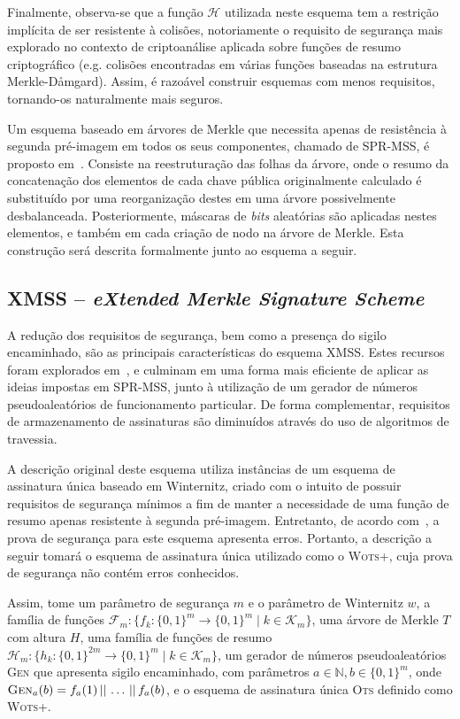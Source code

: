 \documentclass[12pt]{report}
\newcommand{\hh}{\mathcal{H}}
\newcommand{\concat}{\, \vert \vert \,}
\newcommand{\binwds}[1]{\{0, 1\}^{#1}}
\begin{document}
Finalmente, observa-se que a função $\hh{}$ utilizada neste esquema tem a restrição implícita de ser resistente à colisões, notoriamente o requisito de segurança mais explorado no contexto de criptoanálise aplicada sobre funções de resumo criptográfico (e.g. colisões encontradas em várias funções baseadas na estrutura Merkle-D\aa{}mgard). Assim, é razoável construir esquemas com menos requisitos, tornando-os naturalmente mais seguros.

Um esquema baseado em árvores de Merkle que necessita apenas de resistência à segunda pré-imagem em todos os seus componentes, chamado de SPR-MSS, é proposto em~\cite{Dahmen:2008:DSO:1473109.1473117}. Consiste na reestruturação das folhas da árvore, onde o resumo da concatenação dos elementos de cada chave pública originalmente calculado é substituído por uma reorganização destes em uma árvore possivelmente desbalanceada. Posteriormente, máscaras de \emph{bits} aleatórias são aplicadas nestes elementos, e também em cada criação de nodo na árvore de Merkle. Esta construção será descrita formalmente junto ao esquema a seguir.

\subsection{XMSS -- \emph{eXtended Merkle Signature Scheme}}

A redução dos requisitos de segurança, bem como a presença do sigilo encaminhado, são as principais características do esquema XMSS. Estes recursos foram explorados em~\cite{Buchmann:2011:XPF:2184003.2184011}, e culminam em uma forma mais eficiente de aplicar as ideias impostas em SPR-MSS, junto à utilização de um gerador de números pseudoaleatórios de funcionamento particular. De forma complementar, requisitos de armazenamento de assinaturas são diminuídos através do uso de algoritmos de travessia.

A descrição original deste esquema utiliza instâncias de um esquema de assinatura única baseado em Winternitz, criado com o intuito de possuir requisitos de segurança mínimos a fim de manter a necessidade de uma função de resumo apenas resistente à segunda pré-imagem. Entretanto, de acordo com~\cite{LafrancePhilip2017}, a prova de segurança para este esquema apresenta erros. Portanto, a descrição a seguir tomará o esquema de assinatura única utilizado como o \textsc{Wots+}, cuja prova de segurança não contém erros conhecidos.

Assim, tome um parâmetro de segurança $m$ e o parâmetro de Winternitz $w$, a família de funções $\mathcal{F}_m : \{f_k : \binwds{m} \longrightarrow \binwds{m} \mid k \in
\mathcal{K}_m\}$, uma árvore de Merkle $T$ com altura $H$, uma família de funções de resumo $\hh{}_m : \{h_k : \binwds{2m} \longrightarrow \binwds{m} \mid k \in
\mathcal{K}_m\}$, um gerador de números pseudoaleatórios \textsc{Gen} que apresenta sigilo encaminhado, com parâmetros $a \in \mathbb{N}, b \in \binwds{m}$, onde $\textsc{Gen}_{a}(b) = f_a(1) \concat \dots \concat f_a(b)$, e o esquema de assinatura única \textsc{Ots} definido como \textsc{Wots+}.
\end{document}
